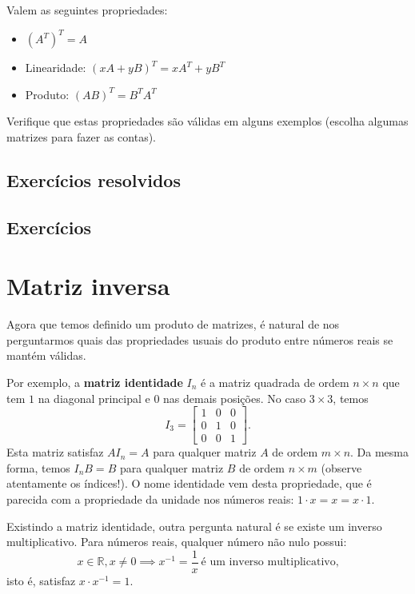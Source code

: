 Valem as seguintes propriedades:
\begin{itemize}
	\item $(A^T)^T = A$
	\item Linearidade: $(xA + y B)^T = x A^T + y B^T$
	\item Produto: $(AB)^T = B^T A^T$
\end{itemize}

\begin{exer}
	Verifique que estas propriedades são válidas em alguns exemplos (escolha algumas matrizes para fazer as contas).
\end{exer}


\subsection*{Exercícios resolvidos}

\construirExeresol

\subsection*{Exercícios}

\construirExer

\section{Matriz inversa}

Agora que temos definido um produto de matrizes, é natural de nos perguntarmos quais das propriedades usuais do produto entre números reais se mantém válidas.

Por exemplo, a \textbf{matriz identidade} $I_n$ é a matriz quadrada de ordem $n \times n$ que tem $1$ na diagonal principal e $0$ nas demais posições. No caso $3 \times 3$, temos
\begin{equation}
I_3 =
\left[
\begin{array}{ccc}
1 & 0 & 0 \\
0 & 1 & 0 \\
0 & 0 & 1 
\end{array}
\right].
\end{equation} Esta matriz satisfaz $A I_n = A$ para qualquer matriz $A$ de ordem $m \times n$. Da mesma forma, temos $I_n B = B$ para qualquer matriz $B$ de ordem $n \times m$ (observe atentamente os índices!). O nome identidade vem desta propriedade, que é parecida com a propriedade da unidade nos números reais: $1\cdot x = x = x\cdot 1$.

Existindo a matriz identidade, outra pergunta natural é se existe um inverso multiplicativo. Para números reais, qualquer número não nulo possui:
\begin{equation}
x \in \mathbb{R}, x \neq 0 \implies x^{-1} = \frac{1}{x} \ \text{é um inverso multiplicativo,}
\end{equation} isto é, satisfaz $x\cdot x^{-1} = 1$.

